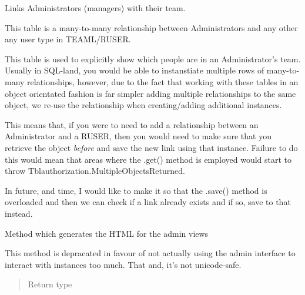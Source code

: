 \documentclass[letterpaper,10pt,english]{sphinxmanual}
\begin{document}
\begin{fulllineitems}
\label{timetracker:timetracker.tracker.models.Tblauthorization}
Links Administrators (managers) with their team.

This table is a many-to-many relationship between Administrators and any
other any user type in TEAML/RUSER.

This table is used to explicitly show which people are in an
Administrator's team. Usually in SQL-land, you would be able to
instanstiate multiple rows of many-to-many relationships, however, due to
the fact that working with these tables in an object orientated fashion is
far simpler adding multiple relationships to the same
{\hyperref[timetracker:timetracker.tracker.models.Tblauthorization]{}} object, we re-use the relationship when
creating/adding additional {\hyperref[timetracker:timetracker.tracker.models.Tblauthorization]{}} instances.

This means that, if you were to need to add a relationship between an
Administrator and a RUSER, then you would need to make sure that you
retrieve the {\hyperref[timetracker:timetracker.tracker.models.Tblauthorization]{}} object \emph{before} and save the new
link using that instance. Failure to do this would mean that areas where
the .get() method is employed would start to throw
Tblauthorization.MultipleObjectsReturned.

In future, and time, I would like to make it so that the .save() method is
overloaded and then we can check if a {\hyperref[timetracker:timetracker.tracker.models.Tblauthorization]{}} link
already exists and if so, save to that instead.

\begin{fulllineitems}
\label{timetracker:timetracker.tracker.models.Tblauthorization.display_users}
Method which generates the HTML for the admin views

This method is depracated in favour of not actually using the admin
interface to interact with {\hyperref[timetracker:timetracker.tracker.models.Tblauthorization]{}} instances too
much. That and, it's not unicode-safe.
\begin{quote}\begin{description}
\item[{Return type}] \leavevmode
{}


\end{description}
\end{quote}
\end{fulllineitems}
\end{fulllineitems}
\end{document}
